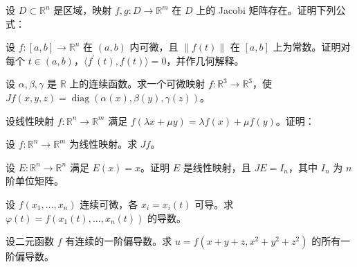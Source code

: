 \noindent\begin{minipage}{\textwidth}
设 $D\subset\mathbb R^n$ 是区域，映射 $f,g:D\to\mathbb R^m$ 在 $D$ 上的 Jacobi 矩阵存在。证明下列公式：
\end{minipage}\par\vfill
\noindent\begin{minipage}{\textwidth}
设 $f:[a,b]\to\mathbb R^n$ 在 $(a,b)$ 内可微，且 $\|f(t)\|$ 在 $[a,b]$ 上为常数。证明对每个 $t\in(a,b)$，$\langle f^{\prime}(t),f(t)\rangle=0$，并作几何解释。
\end{minipage}\par\vfill
\newpage
\noindent\begin{minipage}{\textwidth}
设 $\alpha,\beta,\gamma$ 是 $\mathbb R$ 上的连续函数。求一个可微映射 $f:\mathbb R^3\to\mathbb R^3$，使 $Jf(x,y,z)=\operatorname{diag}(\alpha(x),\beta(y),\gamma(z))$。
\end{minipage}\par\vfill
\noindent\begin{minipage}{\textwidth}
设线性映射 $f:\mathbb R^n\to\mathbb R^m$ 满足 $f(\lambda x+\mu y)=\lambda f(x)+\mu f(y)$。证明：
\end{minipage}\par\vfill
\noindent\begin{minipage}{\textwidth}
设 $f:\mathbb R^n\to\mathbb R^m$ 为线性映射。求 $Jf$。
\end{minipage}\par\vfill
\newpage
\noindent\begin{minipage}{\textwidth}
设 $E:\mathbb R^n\to\mathbb R^n$ 满足 $E(x)=x$。证明 $E$ 是线性映射，且 $JE=I_n$，其中 $I_n$ 为 $n$ 阶单位矩阵。
\end{minipage}\par\vfill
\noindent\begin{minipage}{\textwidth}
设 $f(x_1,\ldots,x_n)$ 连续可微，各 $x_i=x_i(t)$ 可导。求 $\varphi(t)=f(x_1(t),\ldots,x_n(t))$ 的导数。
\end{minipage}\par\vfill
\noindent\begin{minipage}{\textwidth}
设二元函数 $f$ 有连续的一阶偏导数。求 $u=f(x+y+z,x^2+y^2+z^2)$ 的所有一阶偏导数。
\end{minipage}\par\vfill

